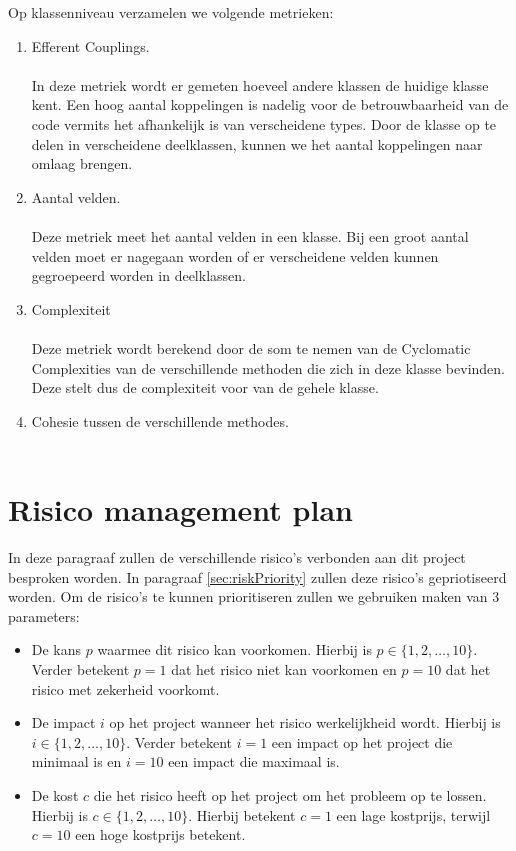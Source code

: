 Op klassenniveau verzamelen we volgende metrieken:
\begin{enumerate}
	\item 
		Efferent Couplings.
		\\
		\\
		In deze metriek wordt er gemeten hoeveel andere klassen de huidige klasse kent. Een hoog aantal koppelingen is nadelig voor de betrouwbaarheid van de code vermits het afhankelijk is van verscheidene types. Door de klasse op te delen in verscheidene deelklassen, kunnen we het aantal koppelingen naar omlaag brengen.
	\item
		Aantal velden.
		\\
		\\ %
		Deze metriek meet het aantal velden in een klasse. Bij een groot aantal velden moet er nagegaan worden of er verscheidene velden kunnen gegroepeerd worden in deelklassen.
	
	\item
		Complexiteit
		\\
		\\
		Deze metriek wordt berekend door de som te nemen van de Cyclomatic Complexities van de verschillende methoden die zich in deze klasse bevinden. Deze stelt dus de complexiteit voor van de gehele klasse.
		
	\item
		Cohesie tussen de verschillende methodes.
		\\
		\\ %
		
		
\end{enumerate}

\section{Risico management plan} \label{sec:risicoManagementPlan}
In deze paragraaf zullen de verschillende risico's verbonden aan dit project besproken worden. In paragraaf \ref{sec:riskPriority} zullen deze risico's gepriotiseerd worden. Om de risico's te kunnen prioritiseren zullen we gebruiken maken van 3 parameters:
\begin{itemize}
	\item 
		De kans $p$ waarmee dit risico kan voorkomen. Hierbij is $ p \in \{1, 2, \ldots , 10\} $. Verder betekent $p = 1$ dat het risico niet kan voorkomen en $p = 10$ dat het risico met zekerheid voorkomt.
	\item 
		De impact $i$ op het project wanneer het risico werkelijkheid wordt. Hierbij is $ i \in \{1, 2, \ldots , 10\} $. Verder betekent $i = 1$ een impact op het project die minimaal is en $i = 10$ een impact die maximaal is.
	\item 
		De kost $c$ die het risico heeft op het project om het probleem op te lossen. Hierbij is $ c \in \{1, 2, \ldots , 10\} $. Hierbij betekent $c = 1$ een lage kostprijs, terwijl $c=10$ een hoge kostprijs betekent.
		
\end{itemize}
